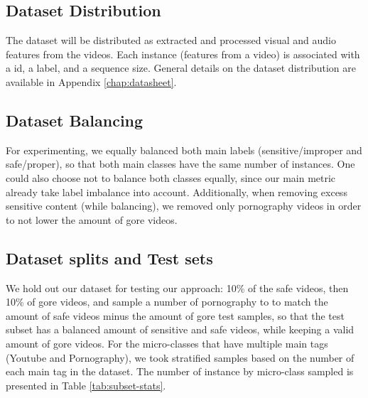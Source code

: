 \subsection{Dataset Distribution}\label{sec:distribution}

The dataset will be distributed as extracted and processed visual and audio features from the videos. Each instance (features from a video) is associated with a id, a label, and a sequence size. General details on the dataset distribution are available in Appendix \ref{chap:datasheet}.



\subsection{Dataset Balancing}\label{sec:balancing}

For experimenting, we equally balanced both main labels (sensitive/improper and safe/proper), so that both main classes have the same number of instances. One could also choose not to balance both classes equally, since our main metric already take label imbalance into account.
Additionally, when removing excess sensitive content (while balancing), we removed only pornography videos in order to not lower the amount of gore videos.


\subsection{Dataset splits and Test sets}\label{sec:testsets}

We hold out our dataset for testing  our approach: 10\% of the safe videos, then 10\% of gore videos, and sample a number of pornography to to match the amount of safe videos minus the amount of gore test samples, so that the test subset has a balanced amount of sensitive and safe videos, while keeping a valid amount of gore videos. For the micro-classes that have multiple main tags (Youtube and Pornography), we took stratified samples based on the number of each main tag in the dataset. The number of instance by micro-class sampled is presented in Table \ref{tab:subset-stats}.


